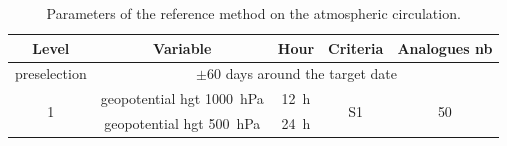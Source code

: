\documentclass{ametsoc}
\begin{document}
%
%
%
% 
% 


% 


%

\begin{table}[htbp]
	\footnotesize
	\caption{Parameters of the reference method on the atmospheric circulation.}
	\begin{center}
		\begin{tabular}{ccccc}
			\hline \textbf{Level} & \textbf{Variable} & \textbf{Hour} & \textbf{Criteria} & \textbf{Analogues nb} \\ 
			\hline 
			preselection & \multicolumn{4}{c}{$\pm 60$ days around the target date} \\
			\hline 
			\multirow{2}{*}{1} & geopotential hgt 1000~hPa & 12~h & \multirow{2}{*}{S1} & \multirow{2}{*}{50} \\
			& geopotential hgt 500~hPa & 24~h & & \\ 
			\hline 
		\end{tabular} 
	\end{center}
	\label{table_params_R1}
\end{table}
\end{document}

